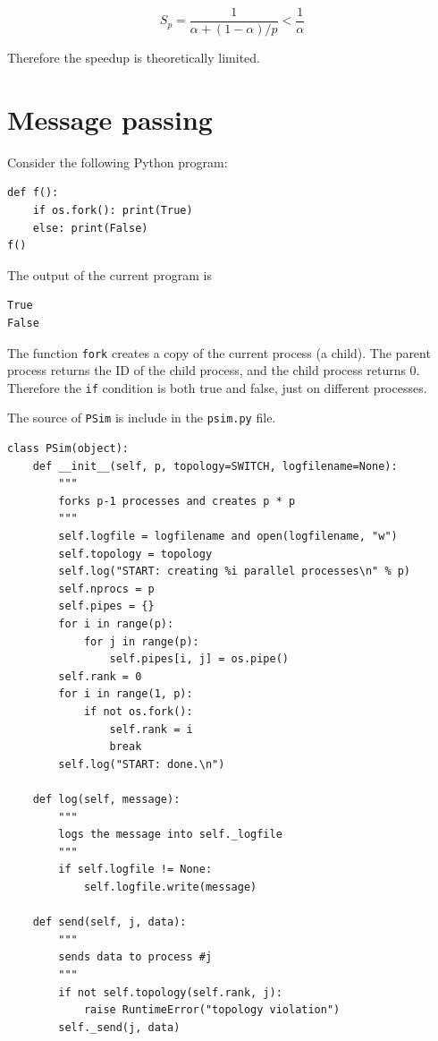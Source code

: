 \documentclass[justified, sixbynine]{tufte-book}
\def\ft{\small\tt}
\theoremstyle{plain}%
\newtheorem * {corollary}{Corollary}
\theoremstyle{definition}
\theoremstyle{remark}
\newtheorem * {remark}{Remark}
\newtheorem * {note}{Note}
\begin{document}
\begin{fullwidth}
\begin{equation}
S_p = \frac{1}{\alpha+(1-\alpha)/p} < \frac{1}{\alpha}
\end{equation}

Therefore the speedup is theoretically limited.

\goodbreak\section{Message passing}

Consider the following Python program:
\begin{lstlisting}
def f():
    if os.fork(): print(True)
    else: print(False)
f()
\end{lstlisting}
The output of the current program is
\begin{lstlisting}
True
False
\end{lstlisting}

The function {\ft fork} creates a copy of the current process (a child). The parent process returns the ID of the child process, and the child process returns 0. Therefore the {\ft if} condition is both true and false, just on different processes.

The source of {\ft PSim} is include in the {\ft psim.py} file.


\begin{lstlisting}[caption={in file: {\ft psim.py}}]
class PSim(object):
    def __init__(self, p, topology=SWITCH, logfilename=None):
        """
        forks p-1 processes and creates p * p
        """
        self.logfile = logfilename and open(logfilename, "w")
        self.topology = topology
        self.log("START: creating %i parallel processes\n" % p)
        self.nprocs = p
        self.pipes = {}
        for i in range(p):
            for j in range(p):
                self.pipes[i, j] = os.pipe()
        self.rank = 0
        for i in range(1, p):
            if not os.fork():
                self.rank = i
                break
        self.log("START: done.\n")

    def log(self, message):
        """
        logs the message into self._logfile
        """
        if self.logfile != None:
            self.logfile.write(message)

    def send(self, j, data):
        """
        sends data to process #j
        """
        if not self.topology(self.rank, j):
            raise RuntimeError("topology violation")
        self._send(j, data)


\end{lstlisting}
\end{fullwidth}
\end{document}
